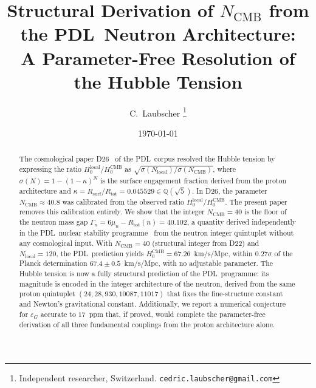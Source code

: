 \documentclass[11pt,a4paper]{article}
\theoremstyle{definition}
\newcommand{\PDL}{\textnormal{PDL}}
\newcommand{\Rsurf}{R_{\mathrm{surf}}}
\newcommand{\Rtot}{R_{\mathrm{tot}}}
\newcommand{\epsg}{\varepsilon_G}
\newcommand{\Hzero}{H_0}
\newcommand{\kap}{\kappa}
\newcommand{\sig}{\sigma}
\begin{document}
\title{%
  Structural Derivation of $N_{\mathrm{CMB}}$ from the \PDL\ Neutron Architecture:\\[4pt]
  A Parameter-Free Resolution of the Hubble Tension%
}
\author{%
  C.~Laubscher%
  \thanks{Independent researcher, Switzerland. \texttt{cedric.laubscher@gmail.com}}\\[4pt]%
}
\date{\small \today}
\maketitle

\begin{abstract}
The cosmological paper D26~\cite{Hubble_Resolution_PDL_2026} of the \PDL\ corpus resolved the Hubble tension by expressing the ratio $\Hzero^{\mathrm{local}}/\Hzero^{\mathrm{CMB}}$ as $\sqrt{\sig(N_{\mathrm{local}})/\sig(N_{\mathrm{CMB}})}$, where $\sig(N) = 1-(1-\kap)^N$ is the surface engagement fraction derived from the proton architecture and $\kap = \Rsurf/\Rtot = 0.045529 \in \mathbb{Q}(\sqrt{5})$. In D26, the parameter $N_{\mathrm{CMB}} \approx 40.8$ was calibrated from the observed ratio $\Hzero^{\mathrm{local}}/\Hzero^{\mathrm{CMB}}$. The present paper removes this calibration entirely. We show that the integer $N_{\mathrm{CMB}} = 40$ is the floor of the neutron mass gap $\Gamma_n = 6\mu_n - \Rtot(n) = 40.102$, a quantity derived independently in the \PDL\ nuclear stability programme~\cite{Nuclear_Stability_PDL_2026} from the neutron integer quintuplet without any cosmological input. With $N_{\mathrm{CMB}} = 40$ (structural integer from D22) and $N_{\mathrm{local}} = 120$, the \PDL\ prediction yields $\Hzero^{\mathrm{CMB}} = 67.26$~km/s/Mpc, within $0.27\sigma$ of the Planck determination $67.4 \pm 0.5$~km/s/Mpc, with no adjustable parameter. The Hubble tension is now a fully structural prediction of the \PDL\ programme: its magnitude is encoded in the integer architecture of the neutron, derived from the same proton quintuplet $(24, 28, 930, 10087, 11017)$ that fixes the fine-structure constant and Newton's gravitational constant. Additionally, we report a numerical conjecture for $\epsg$ accurate to $17$~ppm that, if proved, would complete the parameter-free derivation of all three fundamental couplings from the proton architecture alone.
\end{abstract}

\newpage
\tableofcontents

\end{document}
